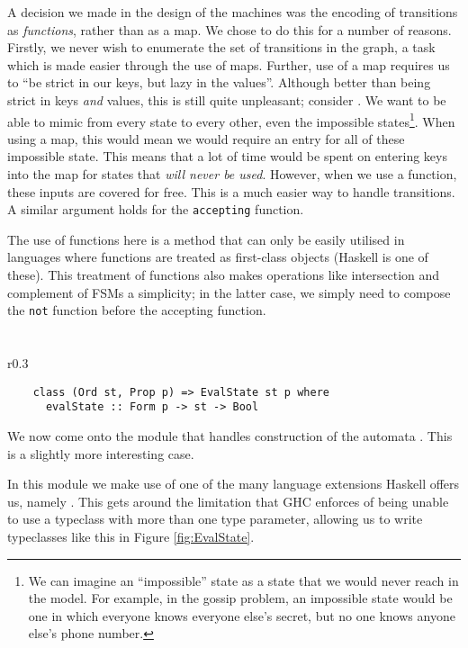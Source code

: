\documentclass[10pt, a4paper]{report}
\begin{document}
A decision we made in the design of the machines was the encoding of transitions
as \emph{functions}, rather than as a map. We chose to do this for a number of
reasons. Firstly, we never wish to enumerate the set of transitions in the
graph, a task which is made easier through the use of maps. Further, use of a
map requires us to ``be strict in our keys, but lazy in the values''. Although
better than being strict in keys \emph{and} values, this is still quite
unpleasant; consider \mestar. We want to be able to mimic from every state to
every other, even the impossible states\footnote{We can imagine an
  ``impossible'' state as a state that we would never reach in the model. For
  example, in the gossip problem, an impossible state would be one in which
  everyone knows everyone else's secret, but no one knows anyone else's phone
  number.}. When using a map, this would mean we would require an entry for all
of these impossible state. This means that a lot of time would be spent on
entering keys into the map for states that \emph{will never be used}. However,
when we use a function, these inputs are covered for free. This is a much easier
way to handle transitions. A similar argument holds for the
\texttt{accepting} function.

The use of functions here is a method that can only be easily utilised in
languages where functions are treated as first-class objects (Haskell is one of
these). This treatment of functions also makes operations like intersection and
complement of FSMs a simplicity; in the latter case, we simply need to compose
the \texttt{not} function before the accepting function. 

\section{}
\label{sec:MEHaskell}

\begin{wrapfigure}{r}{0.3\textwidth}
  \begin{verbatim}
    class (Ord st, Prop p) => EvalState st p where
      evalState :: Form p -> st -> Bool
\end{verbatim}
  \caption{}
  \label{fig:EvalState}
\end{wrapfigure}

We now come onto the module that handles construction of the automata \mestar.
This is a slightly more interesting case.

In this module we make use of one of the many language extensions Haskell offers
us, namely . This gets around the limitation that
GHC enforces of being unable to use a typeclass with more than one type
parameter, allowing us to write typeclasses like this in Figure
\ref{fig:EvalState}.
\end{document}

